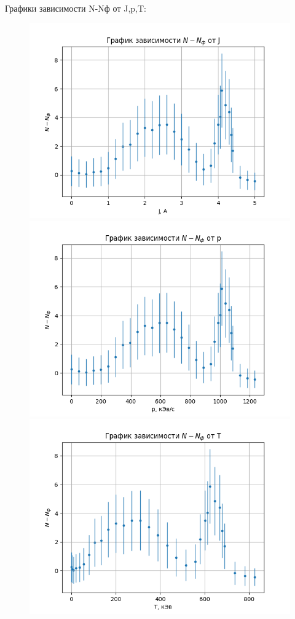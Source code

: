 \documentclass[a4paper,12pt]{article}
\begin{document}
Графики зависимости N-Nф от J,p,T:
\begin{figure}[H]
\centering
\includegraphics[scale=0.7]{graph1.png}
\includegraphics[scale=0.7]{graph2.png}
\includegraphics[scale=0.7]{graph3.png}
\end{figure}
\end{document}
